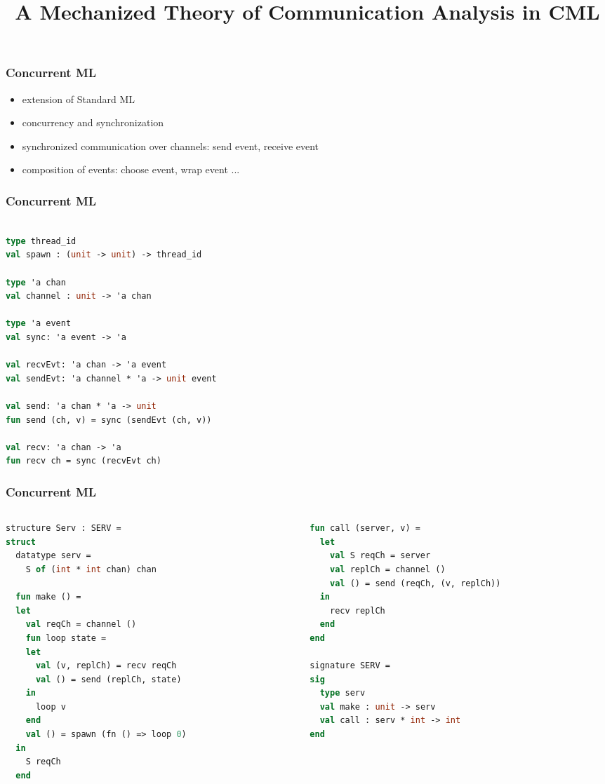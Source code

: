 \documentclass{beamer}
\title{A Mechanized Theory of Communication Analysis in CML}
\begin{document}
\begin{frame}
  \titlepage
\end{frame}

\begin{frame}
\frametitle{Concurrent ML}
\begin{itemize}
\item extension of Standard ML
\item concurrency and synchronization
\item synchronized communication over channels: send event, receive event
\item composition of events: choose event, wrap event ...
\end{itemize}
\end{frame}

\begin{frame}[fragile]
\frametitle{Concurrent ML}
\begin{lstlisting}[language=ML]

type thread_id
val spawn : (unit -> unit) -> thread_id

type 'a chan
val channel : unit -> 'a chan

type 'a event
val sync: 'a event -> 'a

val recvEvt: 'a chan -> 'a event
val sendEvt: 'a channel * 'a -> unit event

val send: 'a chan * 'a -> unit
fun send (ch, v) = sync (sendEvt (ch, v))

val recv: 'a chan -> 'a
fun recv ch = sync (recvEvt ch)

\end{lstlisting}
\end{frame}


\begin{frame}[fragile]
	\frametitle{Concurrent ML}
\begin{columns}
\begin{column}{0.5\textwidth}
\begin{lstlisting}[language=ML, mathescape]
structure Serv : SERV =
struct 
  datatype serv =
    S of (int * int chan) chan

  fun make () =
  let 
    val reqCh = channel ()
    fun loop state =
    let
      val (v, replCh) = recv reqCh
      val () = send (replCh, state)
    in
      loop v
    end
    val () = spawn (fn () => loop 0)
  in
    S reqCh
  end 
\end{lstlisting}
\end{column}


\begin{column}{0.5\textwidth}
\begin{lstlisting}[language=ML, mathescape]
  fun call (server, v) =
  let 
    val S reqCh = server
    val replCh = channel () 
    val () = send (reqCh, (v, replCh))
  in
    recv replCh
  end
end

signature SERV =
sig 
  type serv
  val make : unit -> serv
  val call : serv * int -> int
end
\end{lstlisting}
\end{column}
\end{columns}
\end{frame}
\end{document}
